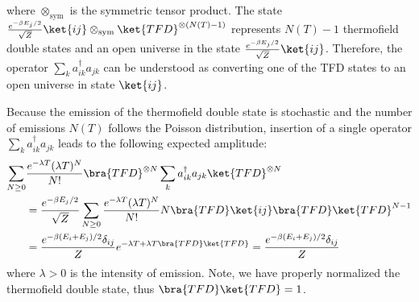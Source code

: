\documentclass[a4paper,11pt]{article}
\theoremstyle{definition}
\numberwithin{equation}{section}
\begin{document}
where $\otimes_\text{sym}$ is the symmetric tensor product. The state $\frac{e^{-\beta E_j/2}}{\sqrt{Z}}\ket{ij}\otimes_\text{sym}\ket{TFD}^{\otimes(N(T) - 1)}$ represents $N(T) -1$ thermofield double states and an open universe in the state $\frac{e^{-\beta E_j/2}}{\sqrt{Z}}\ket{ij}$. Therefore, the operator $\sum_ka^\dagger_{ik}a_{jk}$ can be understood as converting one of the TFD states to an open universe in state $\ket{ij}$.  

Because the emission of the thermofield double state is stochastic and the number of emissions $N(T)$ follows the Poisson distribution, insertion of a single operator $\sum_k a^\dagger_{ik}a_{jk}$ leads to the following expected amplitude:
\begin{align}
    \begin{split}
        \sum_{N\geq 0}&\frac{e^{-\lambda T}(\lambda T)^N}{N!}\bra{TFD}^{\otimes N}\sum_k a^\dagger_{ik}a_{jk}\ket{TFD}^{\otimes N}\\&=\frac{e^{-\beta E_j/2}}{\sqrt{Z}}\sum_{N\geq 0}\frac{e^{-\lambda T}(\lambda T)^N}{N!}N\bra{TFD}\ket{ij}\bra{TFD}\ket{TFD}^{N - 1}
        \\
        &=\frac{e^{-\beta (E_i + E_j)/2}\delta_{ij}}{Z}e^{-\lambda T + \lambda T\bra{TFD}\ket{TFD}} = \frac{e^{-\beta(E_i + E_j)/2}\delta_{ij}}{Z}
    \end{split}
\end{align}
where $\lambda > 0$ is the intensity of emission. Note, we have properly normalized the thermofield double state, thus $\bra{TFD}\ket{TFD} = 1$.
\end{document}
